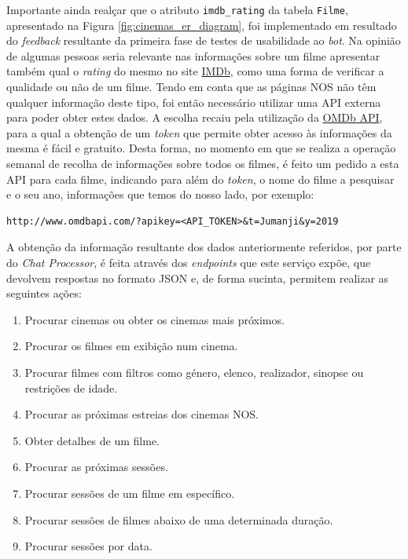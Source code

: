 \documentclass[11pt,a4paper]{article}
\begin{document}
Importante ainda realçar que o atributo \texttt{imdb\_rating} da tabela \texttt{Filme}, apresentado na
Figura \ref{fig:cinemas_er_diagram}, foi implementado em resultado do \textit{feedback} resultante da
primeira fase de testes de usabilidade ao \textit{bot}. Na opinião de algumas pessoas seria relevante nas
informações sobre um filme apresentar também qual o \emph{rating} do mesmo no site
\href{https://www.imdb.com/}{IMDb}, como uma forma de verificar a qualidade ou não de um filme. Tendo em
conta que as páginas NOS não têm qualquer informação deste tipo, foi então necessário utilizar uma API
externa para poder obter estes dados. A escolha recaiu pela utilização da
\href{http://www.omdbapi.com/}{OMDb API}, para a qual a obtenção de um \emph{token} que permite obter acesso
às informações da mesma é fácil e gratuito. Desta forma, no momento em que se realiza a operação semanal de
recolha de informações sobre todos os filmes, é feito um pedido a esta API para cada filme, indicando para
além do \emph{token}, o nome do filme a pesquisar e o seu ano, informações que temos do nosso lado, por
exemplo:

\small{
\begin{verbatim}
http://www.omdbapi.com/?apikey=<API_TOKEN>&t=Jumanji&y=2019
\end{verbatim}}

A obtenção da informação resultante dos dados anteriormente referidos, por parte do \textit{Chat Processor},
é feita através dos \emph{endpoints} que este serviço expõe, que devolvem respostas no formato JSON
e, de forma sucinta, permitem realizar as seguintes ações:

\begin{enumerate}
    \item Procurar cinemas ou obter os cinemas mais próximos.
    \item Procurar os filmes em exibição num cinema.
    \item Procurar filmes com filtros como género, elenco, realizador, sinopse ou restrições de idade.
    \item Procurar as próximas estreias dos cinemas NOS.
    \item Obter detalhes de um filme.
    \item Procurar as próximas sessões.
    \item Procurar sessões de um filme em específico.
    \item Procurar sessões de filmes abaixo de uma determinada duração.
    \item Procurar sessões por data.
\end{enumerate}
\end{document}
